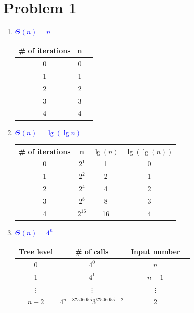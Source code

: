 \documentclass[12pt]{article}
\begin{document}
\section*{Problem 1}

\begin{enumerate}
 \item \textcolor{blue}{$\Theta(n)=n$} \par
    \begin{tabular}{@{}ccc@{}}
    \hline
    \# of iterations & n  \\ \midrule
    0                & 0  \\
    1                & 1  \\
    2                & 2  \\
    3                & 3  \\
    4                & 4  \\ \bottomrule
    \end{tabular}
 \item \textcolor{blue}{$\Theta(n)=\lg(\lg n)$} \par
    \begin{tabular}{@{}cccc@{}}
    \hline
    \# of iterations & n        & $\lg(n)$ & $\lg(\lg(n))$ \\ \midrule
    0                & $2^1$    & 1         &  0              \\
    1                & $2^2$    & 2         &  1              \\
    2                & $2^4$    & 4         &  2              \\
    3                & $2^8$    & 8         &  3              \\
    4                & $2^{16}$ & 16        &  4              \\ \bottomrule
    \end{tabular}
 \item \textcolor{blue}{$\Theta(n)=4^{n}$} \par
    \begin{tabular}{@{}cccc@{}}
    \hline
    Tree level & \# of calls                   & Input number     \\ \midrule
     0         & $4^{0}$                       & $n$              \\
     1         & $4^{1}$                       & $n-1$            \\
     $\vdots$  & $\vdots$                      & $\vdots$         \\
     $n-2$     & $4^{n-87506055}3^{87506055-2}$& 2                \\

\end{tabular}
\end{enumerate}
\end{document}
